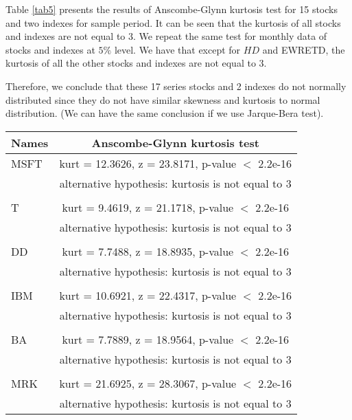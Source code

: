 \documentclass[11pt]{article}
\begin{document}
Table \ref{tab5} presents the results of Anscombe-Glynn kurtosis test for 15 stocks and two indexes for sample period. It can be seen that the kurtosis of all stocks and indexes are not equal to 3. We repeat the same test for monthly data of stocks and indexes at $5\%$ level. We have that except for $HD$ and EWRETD, the kurtosis of all the other stocks and indexes are not equal to 3. 

Therefore, we conclude that these 17 series stocks and 2 indexes do not normally distributed since they do not have similar skewness and kurtosis to normal distribution. (We can have the same conclusion if we use Jarque-Bera test). 

\begin{table}
\tiny
\centering
\begin{tabular}{lc}
  \hline
 Names& Anscombe-Glynn kurtosis test \\ 
  \hline

	
MSFT

&kurt = 12.3626, z = 23.8171, p-value $<$ 2.2e-16\\
&alternative hypothesis: kurtosis is not equal to 3\\

\\
T

	
&kurt = 9.4619, z = 21.1718, p-value $<$ 2.2e-16\\
&alternative hypothesis: kurtosis is not equal to 3\\

\\
DD

&kurt = 7.7488, z = 18.8935, p-value $<$ 2.2e-16\\
&alternative hypothesis: kurtosis is not equal to 3\\

\\
IBM


&kurt = 10.6921, z = 22.4317, p-value $<$ 2.2e-16\\
&alternative hypothesis: kurtosis is not equal to 3\\

\\
BA

	
&kurt = 7.7889, z = 18.9564, p-value $<$ 2.2e-16\\
&alternative hypothesis: kurtosis is not equal to 3\\
\\
MRK

	
&kurt = 21.6925, z = 28.3067, p-value $<$ 2.2e-16\\
&alternative hypothesis: kurtosis is not equal to 3\\


\end{tabular}
\end{table}
\end{document}
